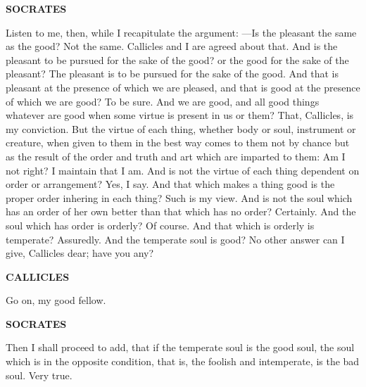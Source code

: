 \documentclass[11pt,letter]{article}
\begin{document}
\par \textbf{SOCRATES}
\par   Listen to me, then, while I recapitulate the argument: —Is the pleasant the same as the good? Not the same. Callicles and I are agreed about that. And is the pleasant to be pursued for the sake of the good? or the good for the sake of the pleasant? The pleasant is to be pursued for the sake of the good. And that is pleasant at the presence of which we are pleased, and that is good at the presence of which we are good? To be sure. And we are good, and all good things whatever are good when some virtue is present in us or them? That, Callicles, is my conviction. But the virtue of each thing, whether body or soul, instrument or creature, when given to them in the best way comes to them not by chance but as the result of the order and truth and art which are imparted to them:  Am I not right? I maintain that I am. And is not the virtue of each thing dependent on order or arrangement? Yes, I say. And that which makes a thing good is the proper order inhering in each thing? Such is my view. And is not the soul which has an order of her own better than that which has no order? Certainly. And the soul which has order is orderly? Of course. And that which is orderly is temperate? Assuredly. And the temperate soul is good? No other answer can I give, Callicles dear; have you any?

\par \textbf{CALLICLES}
\par   Go on, my good fellow.

\par \textbf{SOCRATES}
\par   Then I shall proceed to add, that if the temperate soul is the good soul, the soul which is in the opposite condition, that is, the foolish and intemperate, is the bad soul. Very true.
\end{document}
